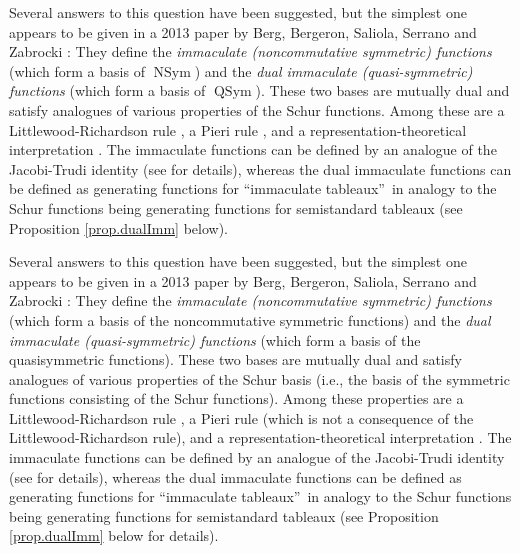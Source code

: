 \documentclass[numbers=enddot,12pt,final,onecolumn,notitlepage,abstracton]{scrartcl}%
\theoremstyle{definition}
\newenvironment{verlong}{}{}
\newenvironment{vershort}{}{}
\begin{document}
\begin{vershort}
Several answers to this question have been suggested, but the simplest one
appears to be given in a 2013 paper by Berg, Bergeron, Saliola, Serrano and
Zabrocki \cite{BBSSZ}: They define the \textit{immaculate (noncommutative
symmetric) functions} (which form a basis of $\operatorname*{NSym}$) and the
\textit{dual immaculate (quasi-symmetric) functions} (which form a basis of
$\operatorname*{QSym}$). These two bases are mutually dual and satisfy
analogues of various properties of the Schur functions. Among these are a
Littlewood-Richardson rule \cite{BBSSZ14}, a Pieri rule \cite{BSOZ13}, and a
representation-theoretical interpretation \cite{BBSSZ13c}. The immaculate
functions can be defined by an analogue of the Jacobi-Trudi identity (see
\cite[Remark 3.28]{BBSSZ} for details), whereas the dual immaculate functions
can be defined as generating functions for \textquotedblleft immaculate
tableaux\textquotedblright\ in analogy to the Schur functions being generating
functions for semistandard tableaux (see Proposition \ref{prop.dualImm} below).
\end{vershort}

\begin{verlong}
Several answers to this question have been suggested, but the simplest one
appears to be given in a 2013 paper by Berg, Bergeron, Saliola, Serrano and
Zabrocki \cite{BBSSZ}: They define the \textit{immaculate (noncommutative
symmetric) functions} (which form a basis of the noncommutative symmetric
functions) and the \textit{dual immaculate (quasi-symmetric) functions} (which
form a basis of the quasisymmetric functions). These two bases are mutually
dual and satisfy analogues of various properties of the Schur basis (i.e., the
basis of the symmetric functions consisting of the Schur functions). Among
these properties are a Littlewood-Richardson rule \cite{BBSSZ14}, a Pieri rule
\cite{BSOZ13} (which is not a consequence of the Littlewood-Richardson rule),
and a representation-theoretical interpretation \cite{BBSSZ13c}. The
immaculate functions can be defined by an analogue of the Jacobi-Trudi
identity (see \cite[Remark 3.28]{BBSSZ} for details), whereas the dual
immaculate functions can be defined as generating functions for
\textquotedblleft immaculate tableaux\textquotedblright\ in analogy to the
Schur functions being generating functions for semistandard tableaux (see
Proposition \ref{prop.dualImm} below for details).
\end{verlong}
\end{document}
